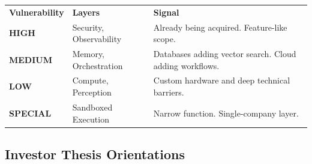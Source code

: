 \documentclass[11pt,a4paper]{article}
\begin{document}
\noindent{}

\vspace{4mm}

\renewcommand{\arraystretch}{1.6}
\noindent\begin{tabularx}{\textwidth}{@{} >{\centering\arraybackslash}p{24mm} X >{\raggedright\arraybackslash}p{52mm} @{}}
\arrayrulecolor{tableborder}
\rowcolor{navy} \textbf{\color{white}\fontsize{8.5}{10}\selectfont Vulnerability} & \textbf{\color{white}\fontsize{8.5}{10}\selectfont Layers} & \textbf{\color{white}\fontsize{8.5}{10}\selectfont Signal} \\
\rowcolor{danger!8} {\fontsize{9}{11}\selectfont\bfseries\color{danger}HIGH} & {\fontsize{9.5}{12}\selectfont Security, Observability} & {\fontsize{8.5}{11}\selectfont Already being acquired. Feature-like scope.} \\
\rowcolor{warning!8} {\fontsize{9}{11}\selectfont\bfseries\color{warning}MEDIUM} & {\fontsize{9.5}{12}\selectfont Memory, Orchestration} & {\fontsize{8.5}{11}\selectfont Databases adding vector search. Cloud adding workflows.} \\
\rowcolor{success!8} {\fontsize{9}{11}\selectfont\bfseries\color{success}LOW} & {\fontsize{9.5}{12}\selectfont Compute, Perception} & {\fontsize{8.5}{11}\selectfont Custom hardware and deep technical barriers.} \\
\rowcolor{primary!5} {\fontsize{9}{11}\selectfont\bfseries\color{primary}SPECIAL} & {\fontsize{9.5}{12}\selectfont Sandboxed Execution} & {\fontsize{8.5}{11}\selectfont Narrow function. Single-company layer.} \\
\end{tabularx}

\vspace{12mm}

\subsection*{Investor Thesis Orientations}

\vspace{4mm}
\end{document}
